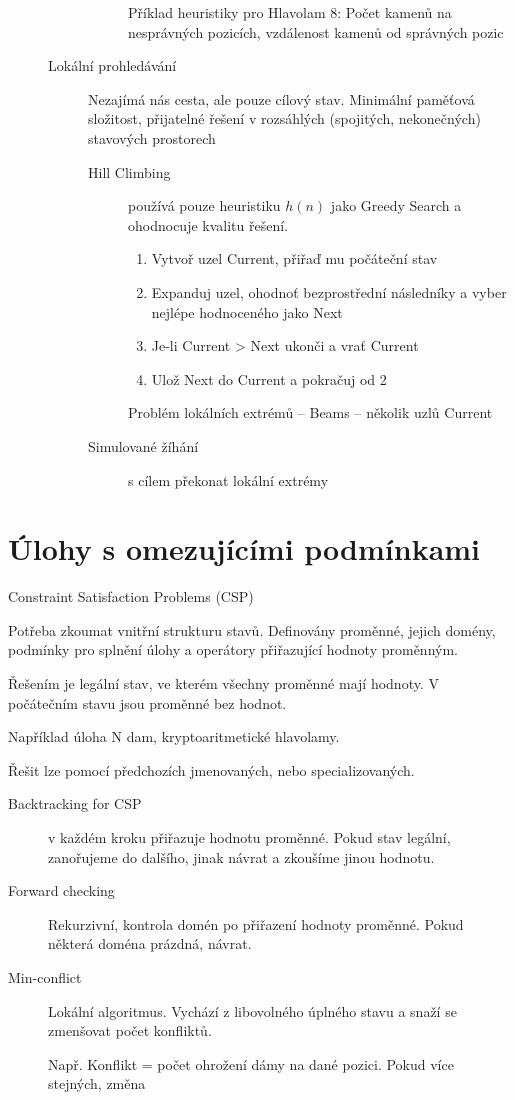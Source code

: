 \documentclass[a4paper, 11pt]{report}
\begin{document}
\begin{description}
\begin{description}
\begin{description}
			Příklad heuristiky pro Hlavolam 8: Počet kamenů na nesprávných pozicích, vzdálenost kamenů od správných pozic
		\end{description}
		\item[Lokální prohledávání] Nezajímá nás cesta, ale pouze cílový stav. Minimální paměťová složitost, přijatelné řešení v rozsáhlých (spojitých, nekonečných) stavových prostorech
		\begin{description}
			\item[Hill Climbing] používá pouze heuristiku $h(n)$ jako Greedy Search a ohodnocuje kvalitu řešení.
			\begin{enumerate}
				\item Vytvoř uzel Current, přiřaď mu počáteční stav
				\item Expanduj uzel, ohodnoť bezprostřední následníky a vyber nejlépe hodnoceného jako Next
				\item Je-li Current > Next ukonči a vrať Current
				\item Ulož Next do Current a pokračuj od 2
			\end{enumerate}
			Problém lokálních extrémů -- Beams -- několik uzlů Current
			
			\item[Simulované žíhání] s cílem překonat lokální extrémy
		\end{description}
	\end{description}
\end{description}

\section{Úlohy s omezujícími podmínkami} Constraint Satisfaction Problems (CSP)

Potřeba zkoumat vnitřní strukturu stavů. Definovány proměnné, jejich domény, podmínky pro splnění úlohy a operátory přiřazující hodnoty proměnným.

Řešením je legální stav, ve kterém všechny proměnné mají hodnoty. V počátečním stavu jsou proměnné bez hodnot.

Například úloha N dam, kryptoaritmetické hlavolamy.

Řešit lze pomocí předchozích jmenovaných, nebo specializovaných.
\begin{description}
	\item[Backtracking for CSP] v každém kroku přiřazuje hodnotu proměnné. Pokud stav legální, zanořujeme do dalšího, jinak návrat a zkoušíme jinou hodnotu.
	
	\item[Forward checking] Rekurzivní, kontrola domén po přiřazení hodnoty proměnné. Pokud některá doména prázdná, návrat.
	
	\item[Min-conflict] Lokální algoritmus. Vychází z libovolného úplného stavu a snaží se zmenšovat počet konfliktů.
	
	Např. Konflikt = počet ohrožení dámy na dané pozici. Pokud více stejných, změna
\end{description}
\end{document}
